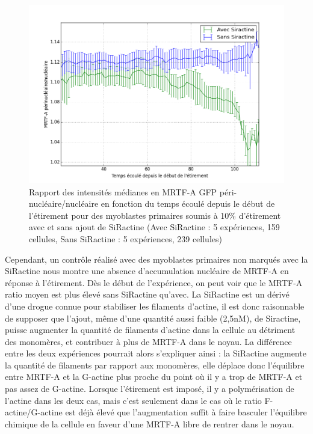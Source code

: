 \begin{figure}
\includegraphics[scale=0.4]{Figures/Avec_Sans_Siractine.png} 
\caption{Rapport des intensités médianes en MRTF-A GFP  péri-nucléaire/nucléaire en fonction du temps écoulé depuis le début de l'étirement pour des myoblastes primaires soumis à 10\% d'étirement avec et sans ajout de SiRactine (Avec SiRactine : 5 expériences, 159 cellules, Sans SiRactine : 5 expériences, 239 cellules)}
\end{figure}

Cependant, un contrôle réalisé avec des myoblastes primaires non marqués avec la SiRactine nous montre une absence d'accumulation nucléaire de MRTF-A en réponse à l'étirement. 
Dès le début de l'expérience, on peut voir que le MRTF-A ratio moyen est plus élevé sans SiRactine qu'avec. 
La SiRactine est un dérivé d'une drogue connue pour stabiliser les filaments d'actine, il est donc raisonnable de supposer que l'ajout, même d'une quantité aussi faible (2,5nM), de Siractine, puisse augmenter la quantité de filaments d'actine dans la cellule au détriment des monomères, et contribuer à plus de MRTF-A dans le noyau. 
La différence entre les deux expériences pourrait alors s'expliquer ainsi : la SiRactine augmente la quantité de filaments par rapport aux monomères, elle déplace donc l'équilibre entre MRTF-A et la G-actine plus proche du point où il y a trop de MRTF-A et pas assez de G-actine.
Lorsque l'étirement est imposé, il y a polymérisation de l'actine dans les deux cas, mais c'est seulement dans le cas où le ratio F-actine/G-actine est déjà élevé que l'augmentation suffit à faire basculer l'équilibre chimique de la cellule en faveur d'une MRTF-A libre de rentrer dans le noyau. 


